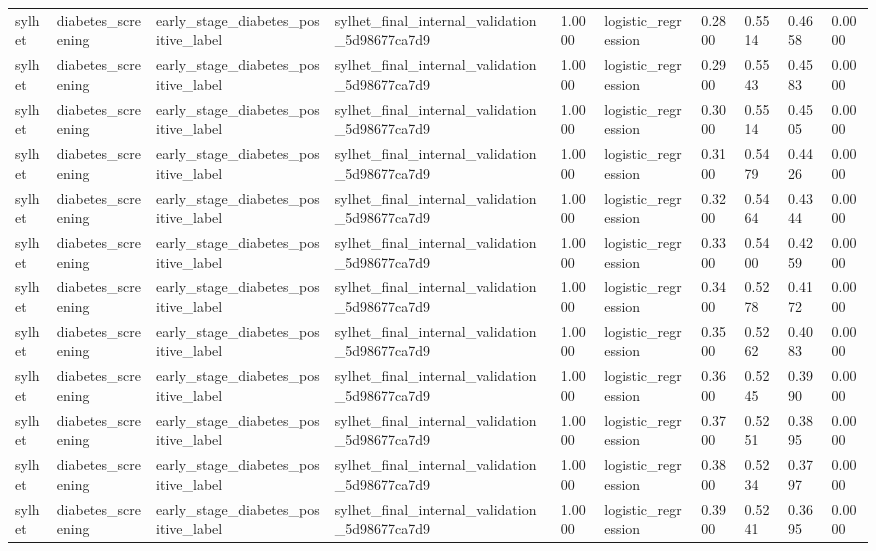 \begin{tabular}{llllllllll}
sylhet & diabetes\_screening & early\_stage\_diabetes\_positive\_label & sylhet\_final\_internal\_validation\_5d98677ca7d9 & 1.0000 & logistic\_regression & 0.2800 & 0.5514 & 0.4658 & 0.0000 \\
sylhet & diabetes\_screening & early\_stage\_diabetes\_positive\_label & sylhet\_final\_internal\_validation\_5d98677ca7d9 & 1.0000 & logistic\_regression & 0.2900 & 0.5543 & 0.4583 & 0.0000 \\
sylhet & diabetes\_screening & early\_stage\_diabetes\_positive\_label & sylhet\_final\_internal\_validation\_5d98677ca7d9 & 1.0000 & logistic\_regression & 0.3000 & 0.5514 & 0.4505 & 0.0000 \\
sylhet & diabetes\_screening & early\_stage\_diabetes\_positive\_label & sylhet\_final\_internal\_validation\_5d98677ca7d9 & 1.0000 & logistic\_regression & 0.3100 & 0.5479 & 0.4426 & 0.0000 \\
sylhet & diabetes\_screening & early\_stage\_diabetes\_positive\_label & sylhet\_final\_internal\_validation\_5d98677ca7d9 & 1.0000 & logistic\_regression & 0.3200 & 0.5464 & 0.4344 & 0.0000 \\
sylhet & diabetes\_screening & early\_stage\_diabetes\_positive\_label & sylhet\_final\_internal\_validation\_5d98677ca7d9 & 1.0000 & logistic\_regression & 0.3300 & 0.5400 & 0.4259 & 0.0000 \\
sylhet & diabetes\_screening & early\_stage\_diabetes\_positive\_label & sylhet\_final\_internal\_validation\_5d98677ca7d9 & 1.0000 & logistic\_regression & 0.3400 & 0.5278 & 0.4172 & 0.0000 \\
sylhet & diabetes\_screening & early\_stage\_diabetes\_positive\_label & sylhet\_final\_internal\_validation\_5d98677ca7d9 & 1.0000 & logistic\_regression & 0.3500 & 0.5262 & 0.4083 & 0.0000 \\
sylhet & diabetes\_screening & early\_stage\_diabetes\_positive\_label & sylhet\_final\_internal\_validation\_5d98677ca7d9 & 1.0000 & logistic\_regression & 0.3600 & 0.5245 & 0.3990 & 0.0000 \\
sylhet & diabetes\_screening & early\_stage\_diabetes\_positive\_label & sylhet\_final\_internal\_validation\_5d98677ca7d9 & 1.0000 & logistic\_regression & 0.3700 & 0.5251 & 0.3895 & 0.0000 \\
sylhet & diabetes\_screening & early\_stage\_diabetes\_positive\_label & sylhet\_final\_internal\_validation\_5d98677ca7d9 & 1.0000 & logistic\_regression & 0.3800 & 0.5234 & 0.3797 & 0.0000 \\
sylhet & diabetes\_screening & early\_stage\_diabetes\_positive\_label & sylhet\_final\_internal\_validation\_5d98677ca7d9 & 1.0000 & logistic\_regression & 0.3900 & 0.5241 & 0.3695 & 0.0000 \\

\end{tabular}
